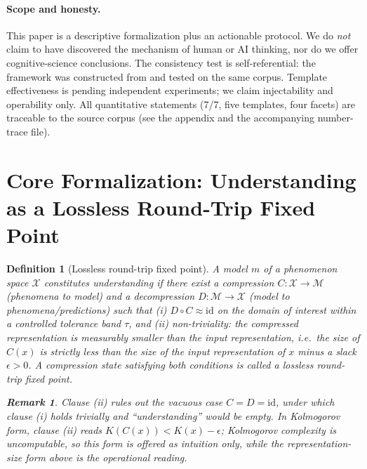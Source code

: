 \documentclass[11pt]{article}
\newtheorem{definition}{Definition}
\newtheorem{remark}{Remark}
\newcommand{\Cmap}{C}
\newcommand{\Dmap}{D}
\begin{document}
\paragraph{Scope and honesty.}
This paper is a descriptive formalization plus an actionable protocol. We do
\emph{not} claim to have discovered the mechanism of human or AI thinking, nor
do we offer cognitive-science conclusions. The consistency test is
self-referential: the framework was constructed from and tested on the same
corpus. Template effectiveness is pending independent experiments; we claim
injectability and operability only. All quantitative statements (7/7, five
templates, four facets) are traceable to the source corpus (see the appendix and
the accompanying number-trace file).
\section{Core Formalization: Understanding as a Lossless Round-Trip Fixed Point}
\label{sec:core}

\begin{definition}[Lossless round-trip fixed point]
\label{def:fixedpoint}
A model $m$ of a phenomenon space $\mathcal{X}$ constitutes \emph{understanding}
if there exist a compression $\Cmap:\mathcal{X}\to\mathcal{M}$ (phenomena to
model) and a decompression $\Dmap:\mathcal{M}\to\mathcal{X}$ (model to
phenomena/predictions) such that (i) $\Dmap\circ\Cmap \approx \mathrm{id}$ on the
domain of interest within a controlled tolerance band $\tau$, and (ii)
\emph{non-triviality}: the compressed representation is measurably smaller than
the input representation, i.e.\ the size of $\Cmap(x)$ is strictly less than the
size of the input representation of $x$ minus a slack $\epsilon>0$. A
compression state satisfying both conditions is called a \emph{lossless
round-trip fixed point}.
\begin{remark}
Clause (ii) rules out the vacuous case $\Cmap=\Dmap=\mathrm{id}$, under which
clause (i) holds trivially and ``understanding'' would be empty. In Kolmogorov
form, clause (ii) reads $K(\Cmap(x)) < K(x) - \epsilon$; Kolmogorov complexity
is uncomputable, so this form is offered as intuition only, while the
representation-size form above is the operational reading.
\end{remark}
\end{definition}
\end{document}
